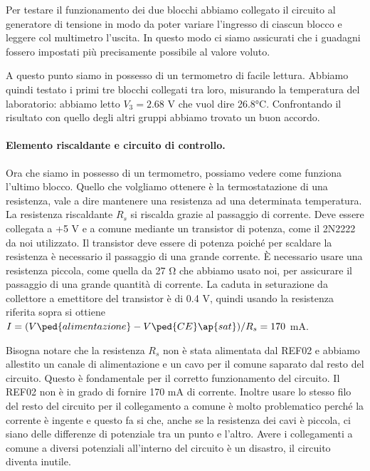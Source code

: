 Per testare il funzionamento dei due blocchi abbiamo collegato il circuito al generatore di tensione in modo da
poter variare l'ingresso di ciascun blocco e leggere col multimetro l'uscita. In questo modo ci siamo assicurati
che i guadagni fossero impostati più precisamente possibile al valore voluto.

A questo punto siamo in possesso di un termometro di facile lettura. Abbiamo quindi testato i primi tre blocchi
collegati tra loro, misurando la temperatura del laboratorio: abbiamo letto $V_3 = 2.68$ V che vuol dire 26.8\si{\celsius}.
Confrontando il risultato con quello degli altri gruppi abbiamo trovato un buon accordo.

\paragraph{Elemento riscaldante e circuito di controllo.}

Ora che siamo in possesso di un termometro, possiamo vedere come funziona l'ultimo blocco. Quello che volgliamo
ottenere è la termostatazione di una resistenza, vale a dire mantenere una resistenza ad una determinata temperatura.
La resistenza riscaldante $R_s$ si riscalda grazie al passaggio di corrente. Deve essere collegata a +5 V e a comune
mediante un transistor di potenza, come il 2N2222 da noi utilizzato. Il transistor deve essere di potenza poiché per scaldare
la resistenza è necessario il passaggio di una grande corrente. È necessario usare una resistenza piccola, come quella
da 27 \si{\ohm} che abbiamo usato noi, per assicurare il passaggio di una grande quantità di corrente. La caduta in seturazione
da collettore a emettitore del transistor è di 0.4 V, quindi usando la resistenza riferita sopra si ottiene
$I = (V\ped{alimentazione} - V\ped{CE}\ap{sat}) / R_s = 170$ mA.

Bisogna notare che la resistenza $R_s$ non è stata alimentata dal REF02 e abbiamo allestito un canale di alimentazione e un cavo
per il comune saparato dal resto del circuito. Questo è fondamentale per il corretto funzionamento del circuito.
Il REF02 non è in grado di fornire 170 mA di corrente. Inoltre usare lo stesso filo del resto del circuito per il collegamento
a comune è molto problematico perché la corrente è ingente e questo fa si che, anche se la resistenza dei cavi è piccola,
ci siano delle differenze di potenziale tra un punto e l'altro. Avere i collegamenti a comune a diversi potenziali
all'interno del circuito è un disastro, il circuito diventa inutile.

